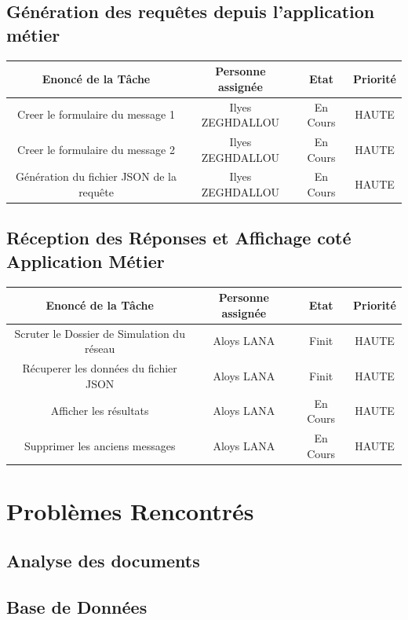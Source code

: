 \documentclass[a4paper, 11pt]{article}
\begin{document}
    \subsection{Génération des requêtes depuis l'application métier}
    \begin{center}
    \begin{tabular}{|c|c|c|c|}
        \hline
        Enoncé de la Tâche & Personne assignée & Etat & Priorité\\
        \hline
        \hline
        Creer le formulaire du message 1  & Ilyes ZEGHDALLOU & En Cours & HAUTE \\
        \hline
        Creer le formulaire du message 2  & Ilyes ZEGHDALLOU & En Cours & HAUTE \\
        \hline
        Génération du fichier JSON de la requête  & Ilyes ZEGHDALLOU & En Cours & HAUTE \\
        \hline
    \end{tabular}
    \end{center}

    \subsection{Réception des Réponses et Affichage coté Application Métier}
    \begin{center}
    \begin{tabular}{|c|c|c|c|}
        \hline
        Enoncé de la Tâche & Personne assignée & Etat & Priorité\\
        \hline
        \hline
        Scruter le Dossier de Simulation du réseau  & Aloys LANA & Finit & HAUTE \\
        \hline
        Récuperer les données du fichier JSON  & Aloys LANA & Finit & HAUTE \\
        \hline
        Afficher les résultats  & Aloys LANA & En Cours & HAUTE \\
        \hline
        Supprimer les anciens messages  & Aloys LANA & En Cours & HAUTE \\
        \hline
    \end{tabular}
    \end{center}


\section{Problèmes Rencontrés}
    \subsection{Analyse des documents}

    \subsection{Base de Données}
\end{document}
